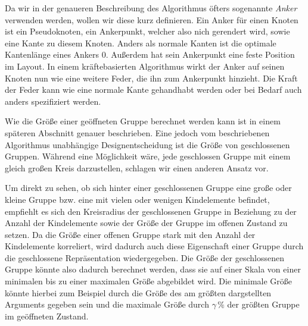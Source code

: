 Da wir in der genaueren Beschreibung des Algorithmus öfters sogenannte \textit{Anker} verwenden werden, wollen wir diese kurz definieren. 
Ein Anker für einen Knoten ist ein Pseudoknoten, ein Ankerpunkt, welcher also nich gerendert wird, sowie eine Kante zu diesem Knoten. 
Anders als normale Kanten ist die optimale Kantenlänge eines Ankers  0. Außerdem hat sein Ankerpunkt  eine feste Position im Layout. 
In einem kräftebasierten Algorithmus wirkt der Anker auf seinen Knoten nun wie eine weitere Feder, die ihn zum Ankerpunkt hinzieht.
Die Kraft der Feder kann wie eine normale Kante gehandhabt werden oder bei Bedarf auch anders spezifiziert werden.


Wie die Größe einer geöffneten Gruppe berechnet werden kann ist in einem späteren Abschnitt genauer beschrieben. 
Eine jedoch vom beschriebenen Algorithmus unabhängige Designentscheidung ist die Größe von geschlossenen Gruppen.
Während eine Möglichkeit wäre, jede geschlossen Gruppe mit einem gleich großen Kreis darzustellen, schlagen wir einen anderen Ansatz vor.

Um direkt zu sehen, ob sich hinter einer geschlossenen Gruppe eine große oder kleine Gruppe bzw. eine mit vielen oder wenigen Kindelemente befindet, empfiehlt es sich den Kreisradius der geschlossenen Gruppe in Beziehung zu der Anzahl der Kindelemente sowie der Größe der Gruppe im offenen Zustand zu setzen.
Da die Größe einer offenen Gruppe stark mit den Anzahl der Kindelemente korreliert, wird dadurch auch diese Eigenschaft einer Gruppe durch die geschlossene Repräsentation
wiedergegeben.
Die Größe der geschlossenen Gruppe könnte also dadurch berechnet werden, dass sie auf einer Skala von einer minimalen bis zu einer maximalen Größe abgebildet wird.
Die minimale Größe könnte hierbei zum Beispiel durch die Größe des am größten dargstellten Arguments gegeben sein und die maximale Größe durch $\gamma \,\%$ 
der größten Gruppe im geöffneten Zustand.

